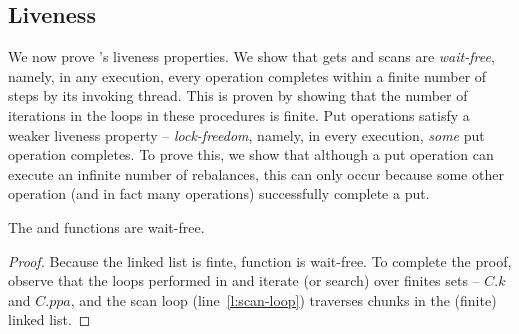 

\subsection{Liveness}
\label{sec:live}

We now prove \kiwi's liveness properties. 
We show that gets and scans are \emph{wait-free}, namely, in any execution, every operation completes within a finite number of steps by its invoking thread. 
 This is proven  by showing that the number of iterations in the loops in these procedures is finite. 
 Put operations satisfy a weaker liveness property --  \emph{lock-freedom}, namely, in every execution, \emph{some} put operation completes.
To prove this, we show that although a put operation can execute an infinite number of rebalances, this can only occur because 
some other operation (and in fact many operations) successfully complete a put.


\begin{lemma}
The   and  functions are wait-free.
\end{lemma}
\begin{proof}
Because the linked list is finte,  function is wait-free. 
To complete the proof, observe that the loops performed in  and 
 iterate (or search) over finites sets -- $C.k$ and $C.ppa$, and the scan loop (line~\ref{l:scan-loop}) traverses
 chunks in the (finite) linked list. 
\end{proof}

